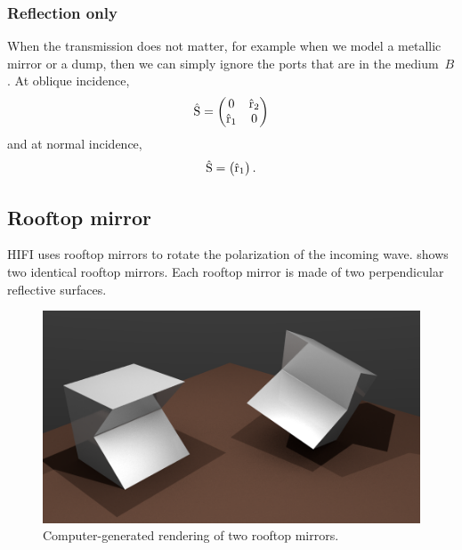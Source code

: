\subsubsection{Reflection only}
When the transmission does not matter, for example when we model a metallic mirror or a dump, then we can simply ignore the ports that are in the medium~$B$.
At oblique incidence,
\begin{equation}
    \hat{\mathrm{S}}
    =
    \begin{pmatrix}
        0            & \hat{\mathrm{r}}_2 \\
        \hat{\mathrm{r}}_1 & 0 
    \end{pmatrix}
\end{equation}
and at normal incidence,
\begin{equation}
    \hat{\mathrm{S}}
    =
    \begin{pmatrix}
        \hat{\mathrm{r}}_1
    \end{pmatrix}
    \text{.}
\end{equation}



\subsection{Rooftop mirror}
HIFI uses rooftop mirrors to rotate the polarization of the incoming wave.
 shows two identical rooftop mirrors.
Each rooftop mirror is made of two perpendicular reflective surfaces.
\begin{figure}[hbtp]
    \centering
    \includegraphics[width=\textwidth]{rooftop_render}
    \caption{Computer-generated rendering of two rooftop mirrors.}
    \label{fig:rooftop_render}
\end{figure}

